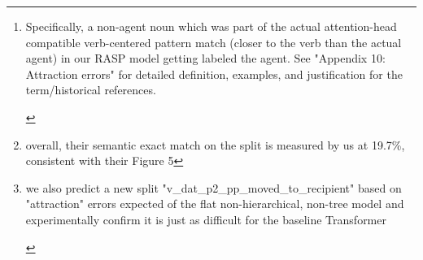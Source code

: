 \documentclass[11pt]{article}
\begin{document}
\begin{abstract}
We find a single flat pattern matching rule we originally added to fit training examples, to ignore "pp det common\_noun" and "pp proper\_noun" when matching nouns for the agent, theme, recipient right indices, is sufficient to avoid structural generalization errors due to pp modification in novel positions. Interestingly, we imagined ablating that single rule and hypothesized attraction to the nearest noun\footnote{\begin{tiny}
Specifically, a non-agent noun which was part of the actual attention-head compatible verb-centered pattern match (closer to the verb than the actual agent) in our RASP model getting labeled the agent. See "Appendix 10: Attraction errors" for detailed definition, examples, and justification for the term/historical references.
\end{tiny}
} in its absence and found this predicted the exact error 
in 96\% of the single relationship errors the \cite{Wu2023} baseline Transformers make on the obj-pp-to-subj-pp split\footnote{overall, their semantic exact match on the split is measured by us at 19.7\%, consistent with their Figure 5} when the agent is left of the verb in single verb sentences\footnote{\begin{tiny}
we also predict a new split "v\_dat\_p2\_pp\_moved\_to\_recipient" based on "attraction" errors expected of the flat non-hierarchical, non-tree model and experimentally confirm it is just as difficult for the baseline Transformer
\end{tiny}} (suggesting perhaps that the baseline \cite{Wu2023} Transformer trained from scratch is also not learning a hierarchical, tree-structured representation.) Thus we demonstrate using RASP that hierarchical/tree-like solutions
are not required for high accuracy on ReCOGS which is semantically equivalent to COGS and argue it is likely Transformer models will be able to perform the ReCOGS\_pos near perfectly including the structural generalization splits, but a different learning strategy may be required.
\end{abstract}
\end{document}
